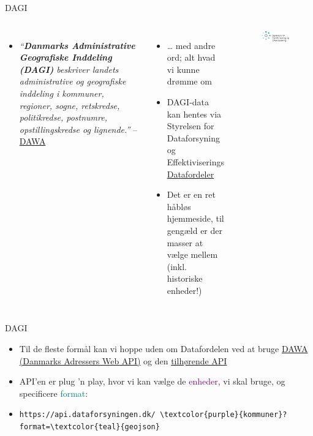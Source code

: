 \documentclass[
  8pt,
  ignorenonframetext,
  aspectratio=169]{beamer}
\providecommand{\tightlist}{%
  \setlength{\itemsep}{0pt}\setlength{\parskip}{0pt}}
\newcommand{\columnsbegin}{\begin{columns}}
\newcommand{\columnsend}{\end{columns}}
\begin{document}
\begin{frame}{DAGI}
\protect\hypertarget{dagi}{}
\columnsbegin


\begin{itemize}
\tightlist
\item
  \emph{``\textbf{Danmarks Administrative Geografiske Inddeling (DAGI)}
  beskriver landets administrative og geografiske inddeling i kommuner,
  regioner, sogne, retskredse, politikredse, postnumre,
  opstillingskredse og lignende.''} --
  \href{https://dawadocs.dataforsyningen.dk/dok/dagi}{DAWA}
\end{itemize}

\medskip

\begin{itemize}
\item
  \ldots{} med andre ord; alt hvad vi kunne drømme om
\item
  DAGI-data kan hentes via Styrelsen for Dataforsyning og
  Effektiviserings
  \href{https://datafordeler.dk/dataoversigt/}{Datafordeler}
\item
  Det er en ret håbløs hjemmeside, til gengæld er der masser at vælge
  mellem (inkl. historiske enheder!)
\end{itemize}


\begin{figure}[H]
    \centering
    \includegraphics[width=.90\textwidth]{pictures/logo_sdfe.png}
\end{figure}

\columnsend
\end{frame}

\begin{frame}{DAGI}
\protect\hypertarget{dagi-1}{}
\begin{itemize}
\item
  Til de fleste formål kan vi hoppe uden om Datafordelen ved at bruge
  \href{https://dawadocs.dataforsyningen.dk/dok/dagi}{DAWA (Danmarks
  Adressers Web API)} og den
  \href{https://dawadocs.dataforsyningen.dk/dok/api\#dagi}{tilhørende
  API}
\item
  API'en er plug 'n play, hvor vi kan vælge de
  \textcolor{purple}{enheder}, vi skal bruge, og specificere
  \textcolor{teal}{format}:
\item
  \nolinkurl{https://api.dataforsyningen.dk/ \textcolor{purple}{kommuner}?format=\textcolor{teal}{geojson}}
\end{itemize}
\end{frame}
\end{document}
